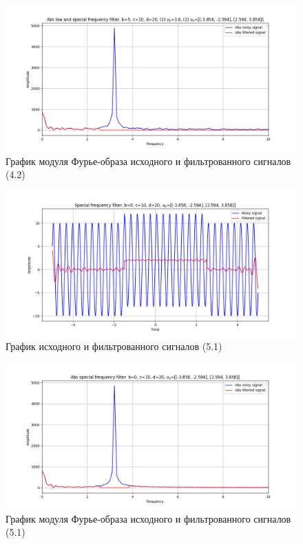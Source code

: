 \documentclass[a4paper, 12pt]{article}
\begin{document}
    \begin{figure}[H]
        \centering
        \includegraphics[scale=0.48]{4_abs_nospec_nohigh.png}
        \captionsetup{skip=0pt}
        \caption{График модуля Фурье-образа исходного и фильтрованного сигналов (4.2)}
        \label{fig:fig78234}
    \end{figure}
    \begin{figure}[H]
        \centering
        \includegraphics[scale=0.48]{5_nospec.png}
        \captionsetup{skip=0pt}
        \caption{График исходного и фильтрованного сигналов (5.1)}
        \label{fig:fig712345}
    \end{figure}
    \begin{figure}[H]
        \centering
        \includegraphics[scale=0.48]{5_abs_nospec.png}
        \captionsetup{skip=0pt}
        \caption{График модуля Фурье-образа исходного и фильтрованного сигналов (5.1)}
        \label{fig:fig722345}
    \end{figure}
\end{document}
